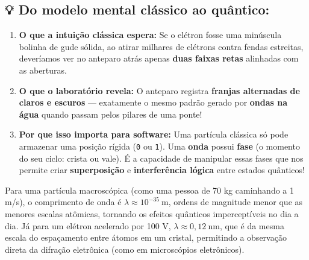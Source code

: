 \documentclass[
  brazilian,
]{report}
\providecommand{\tightlist}{%
  \setlength{\itemsep}{0pt}\setlength{\parskip}{0pt}}
\begin{document}
\subsection{💡 Do modelo mental clássico ao
quântico:}\label{do-modelo-mental-cluxe1ssico-ao-quuxe2ntico}

\begin{enumerate}
\def\labelenumi{\arabic{enumi}.}
\tightlist
\item
  \textbf{O que a intuição clássica espera:} Se o elétron fosse uma
  minúscula bolinha de gude sólida, ao atirar milhares de elétrons
  contra fendas estreitas, deveríamos ver no anteparo atrás apenas
  \textbf{duas faixas retas} alinhadas com as aberturas.
\item
  \textbf{O que o laboratório revela:} O anteparo registra
  \textbf{franjas alternadas de claros e escuros} --- exatamente o mesmo
  padrão gerado por \textbf{ondas na água} quando passam pelos pilares
  de uma ponte!
\item
  \textbf{Por que isso importa para software:} Uma partícula clássica só
  pode armazenar uma posição rígida (\texttt{0} ou \texttt{1}). Uma
  \textbf{onda} possui \textbf{fase} (o momento do seu ciclo: crista ou
  vale). É a capacidade de manipular essas fases que nos permite criar
  \textbf{superposição} e \textbf{interferência lógica} entre estados
  quânticos!
\end{enumerate}

\begin{tcolorbox}[enhanced jigsaw, arc=.35mm, bottomrule=.15mm, bottomtitle=1mm, breakable, colback=white, colbacktitle=quarto-callout-note-color!10!white, colframe=quarto-callout-note-color-frame, coltitle=black, left=2mm, leftrule=.75mm, opacityback=0, opacitybacktitle=0.6, rightrule=.15mm, title=\textcolor{quarto-callout-note-color}{\faInfo}\hspace{0.5em}{🔬 Quer se aprofundar na Física? Comprimento de Onda de Broglie}, titlerule=0mm, toprule=.15mm, toptitle=1mm]

Para uma partícula macroscópica (como uma pessoa de 70 kg caminhando a 1
m/s), o comprimento de onda é \(\lambda \approx 10^{-35}\ \text{m}\),
ordens de magnitude menor que as menores escalas atômicas, tornando os
efeitos quânticos imperceptíveis no dia a dia. Já para um elétron
acelerado por 100 V, \(\lambda \approx 0{,}12\ \text{nm}\), que é da
mesma escala do espaçamento entre átomos em um cristal, permitindo a
observação direta da difração eletrônica (como em microscópios
eletrônicos).

\end{tcolorbox}
\end{document}
